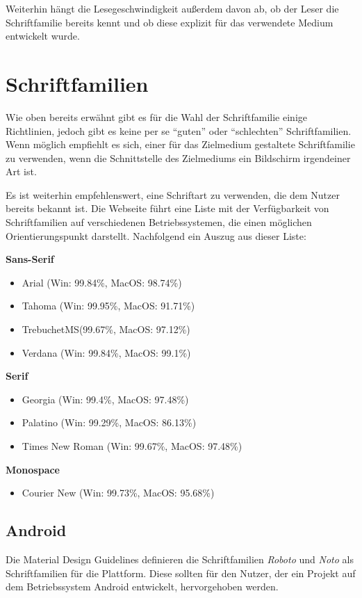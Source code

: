 Weiterhin hängt die Lesegeschwindigkeit außerdem davon ab, ob der Leser die Schriftfamilie bereits kennt und ob diese explizit für das verwendete Medium entwickelt wurde. \cite{josephson2008keeping}



\section{Schriftfamilien}
Wie oben bereits erwähnt gibt es für die Wahl der Schriftfamilie einige Richtlinien, jedoch gibt es keine per se “guten” oder “schlechten” Schriftfamilien.
Wenn möglich empfiehlt es sich, einer für das Zielmedium gestaltete Schriftfamilie zu verwenden, wenn die Schnittstelle des Zielmediums ein Bildschirm irgendeiner Art ist.

Es ist weiterhin empfehlenswert, eine Schriftart zu verwenden, die dem Nutzer bereits bekannt ist. Die Webseite \cite{cssfontstack} führt eine Liste mit der Verfügbarkeit von Schriftfamilien auf verschiedenen Betriebssystemen, die einen möglichen Orientierungspunkt darstellt. Nachfolgend ein Auszug aus dieser Liste:

\textbf{Sans-Serif}
\begin{itemize}
	\item Arial (Win: 99.84\%, MacOS: 98.74\%)
	\item Tahoma (Win: 99.95\%, MacOS: 91.71\%)
	\item TrebuchetMS(99.67\%, MacOS: 97.12\%)
	\item Verdana (Win: 99.84\%, MacOS: 99.1\%)
\end{itemize}

\textbf{Serif}
\begin{itemize}
	\item Georgia (Win: 99.4\%, MacOS: 97.48\%)
	\item Palatino (Win: 99.29\%, MacOS: 86.13\%)
	\item Times New Roman (Win: 99.67\%, MacOS: 97.48\%)
\end{itemize}

\textbf{Monospace}

\begin{itemize}
	\item Courier New (Win: 99.73\%, MacOS: 95.68\%)
\end{itemize}
 

\subsection{Android}
Die Material Design Guidelines definieren die Schriftfamilien \textit{Roboto} und \textit{Noto} als Schriftfamilien für die Plattform. Diese sollten für den Nutzer, der ein Projekt auf dem Betriebssystem Android entwickelt, hervorgehoben werden.


